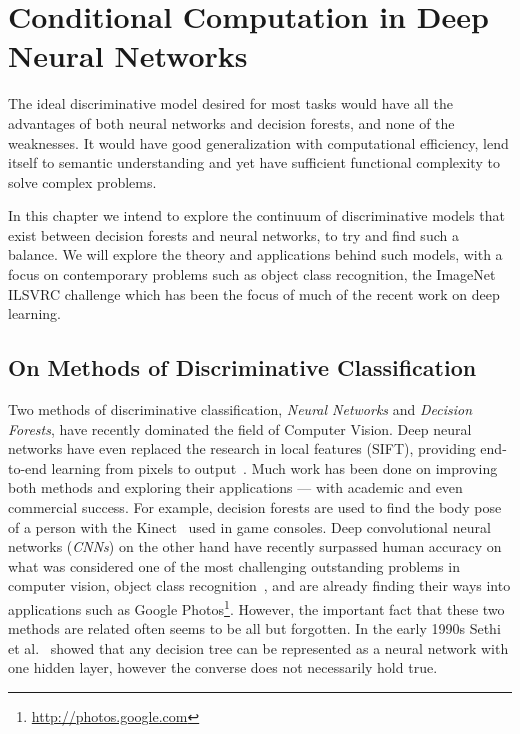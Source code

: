 \documentclass[thesis]{subfiles}
\begin{document}
	\chapter{Conditional Computation in Deep Neural Networks}
	\label{conditionalnetworks}
	
	The ideal discriminative model desired for most tasks would have all the advantages of both neural networks and decision forests, and none of the weaknesses. It would have good generalization with computational efficiency, lend itself to semantic understanding and yet have sufficient functional complexity to solve complex problems. 
	
	In this chapter we intend to explore the continuum of discriminative models that exist between decision forests and neural networks, to try and find such a balance. We will explore the theory and applications behind such models, with a focus on contemporary problems such as object class recognition, \ie the ImageNet ILSVRC challenge which has been the focus of much of the recent work on deep learning.
	
	\section{On Methods of Discriminative Classification}
	
	Two methods of discriminative classification, \emph{Neural Networks} and \emph{Decision Forests}, have recently dominated the field of Computer Vision. Deep neural networks have even replaced the research in local features (\eg SIFT), providing end-to-end learning from pixels to output~\citep{yi2016lift}. Much work has been done on improving both methods and exploring their applications --- with academic and even commercial success. For example, decision forests are used to find the body pose of a person with the Kinect~\citep{conf/cvpr/ShottonFCSFMKB11} used in game consoles. Deep convolutional neural networks (\emph{CNNs}) on the other hand have recently surpassed human accuracy on what was considered one of the most challenging outstanding problems in computer vision, object class recognition~\citep{He2015b}, and are already finding their ways into applications such as Google Photos\footnote{\href{http://photos.google.com}{http://photos.google.com}}. However, the important fact that these two methods are related often seems to be all but forgotten. In the early 1990s Sethi et al.~\citep{Sethi1990} showed that any decision tree can be represented as a neural network with one hidden layer, however the converse does not necessarily hold true.
	
\end{document}
